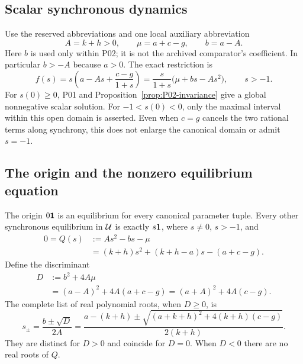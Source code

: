\subsection{Scalar synchronous dynamics}
\label{slot:P02-2}
Use the reserved abbreviations and one local auxiliary abbreviation
\begin{equation}
\label{eq:P02-abbreviations}
 A=k+h>0,\qquad \mu=a+c-g,\qquad b=a-A.
\end{equation}
Here $b$ is used only within P02; it is not the archived comparator's
coefficient. In particular $b>-A$ because $a>0$. The exact restriction is
\begin{equation}
\label{eq:P02-scalar}
 f(s)=s\left(a-As+\frac{c-g}{1+s}\right)
     =\frac{s}{1+s}\bigl(\mu+bs-As^2\bigr),\qquad s>-1.
\end{equation}
For $s(0)\ge0$, P01 and Proposition~\ref{prop:P02-invariance}
give a global nonnegative scalar solution. For $-1<s(0)<0$, only
the maximal interval within this open domain is asserted. Even when
$c=g$ cancels the two rational terms along synchrony, this does not
enlarge the canonical domain or admit $s=-1$.

\subsection{The origin and the nonzero equilibrium equation}

\begin{proposition}
\label{prop:P02-equation}
The origin $0\mathbf{1}$ is an equilibrium for every canonical parameter
tuple. Every other synchronous equilibrium in $\mathcal{U}$ is exactly
$s\mathbf{1}$, where $s\ne0$, $s>-1$, and
\begin{align}
 0=Q(s)&:=As^2-bs-\mu \label{eq:P02-polynomial}\\
       &=(k+h)s^2+(k+h-a)s-(a+c-g).\nonumber
\end{align}
Define the discriminant
\begin{align}
 D&:=b^2+4A\mu \label{eq:P02-discriminant}\\
  &=(a-A)^2+4A(a+c-g)
   =(a+A)^2+4A(c-g).\nonumber
\end{align}
The complete list of real polynomial roots, when $D\ge0$, is
\begin{equation}
\label{eq:P02-roots}
 s_\pm=\frac{b\pm\sqrt D}{2A}
 =\frac{a-(k+h)\pm
 \sqrt{(a+k+h)^2+4(k+h)(c-g)}}{2(k+h)}.
\end{equation}
They are distinct for $D>0$ and coincide for $D=0$. When $D<0$
there are no real roots of $Q$.
\end{proposition}

